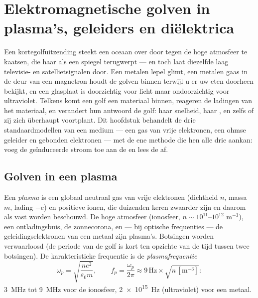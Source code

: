 \chapter{Elektromagnetische golven in plasma's, geleiders en
diëlektrica}\label{ch:b2:waves-in-media}

Een kortegolfuitzending steekt een oceaan over door tegen de hoge atmosfeer
te kaatsen, die haar als een spiegel terugwerpt --- en toch laat diezelfde
laag televisie- en satellietsignalen door. Een metalen lepel glimt, een
metalen gaas in de deur van een magnetron houdt de golven binnen terwijl u
er uw eten doorheen bekijkt, en een glasplaat is doorzichtig voor licht maar
ondoorzichtig voor ultraviolet. Telkens komt een golf een materiaal binnen,
reageren de ladingen van het materiaal, en verandert hun antwoord de golf:
haar snelheid, haar , en zelfs of zij zich überhaupt voortplant.
Dit hoofdstuk behandelt de drie standaardmodellen van een medium --- een gas
van vrije elektronen, een ohmse geleider en gebonden elektronen --- met de
ene methode die hen alle drie aankan: voeg de geïnduceerde stroom toe aan de
 en lees de  af.

\section{Golven in een plasma}

\begin{definition}\label{def:b2:waves-in-media:plasma}
Een \emph{plasma} is een globaal neutraal gas van vrije elektronen
(dichtheid $n$, massa $m$, lading $-e$) en positieve ionen, die duizenden
keren zwaarder zijn en daarom als vast worden beschouwd. De hoge atmosfeer
(ionosfeer, $n \sim 10^{11}$--$10^{12}$ m$^{-3}$), een ontladingsbuis, de
zonnecorona, en --- bij optische frequenties --- de geleidingselektronen van
een metaal zijn plasma's. Botsingen worden verwaarloosd (de periode van de
golf is kort ten opzichte van de tijd tussen twee botsingen). De
karakteristieke frequentie is de \emph{plasmafrequentie}
\[
\omega_p = \sqrt{\frac{ne^2}{\varepsilon_0m}} , \qquad
f_p = \frac{\omega_p}{2\pi} \approx 9\,\text{Hz}\times\sqrt{n\,[\text{m}^{-3}]} :
\]
\qty{3}{MHz} tot \qty{9}{MHz} voor de ionosfeer, \qty{2e15}{Hz}
(ultraviolet) voor een metaal.
\end{definition}

